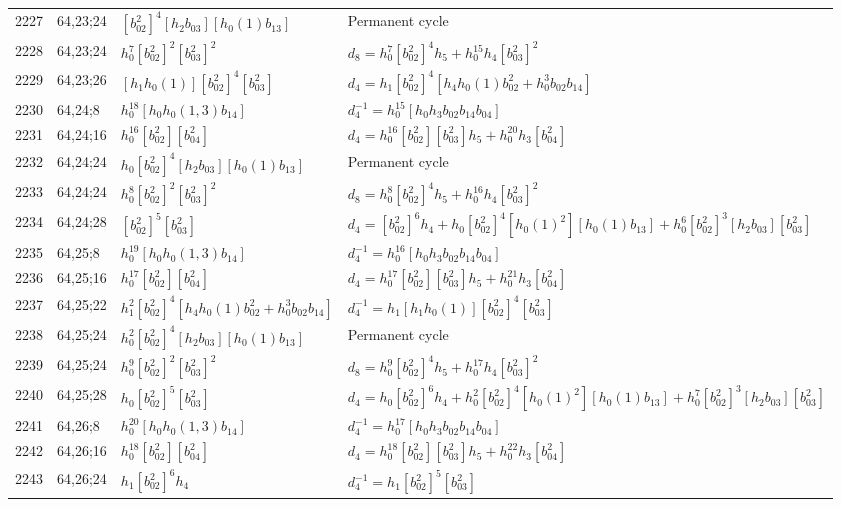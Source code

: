 \documentclass{article}
\begin{document}
\begin{longtable}{|l|l|>{\raggedright\arraybackslash}p{6cm}|>{\raggedright\arraybackslash}p{6cm}|}
\hline
2227 & 64,23;24 & $[b_{02}^2]^4[h_2b_{03}][h_0(1)b_{13}]$ & Permanent cycle\\
2228 & 64,23;24 & $h_0^7[b_{02}^2]^2[b_{03}^2]^2$ &$d_{8}=h_0^7[b_{02}^2]^4h_5 + h_0^{15}h_4[b_{03}^2]^2$\\
\hline
2229 & 64,23;26 & $[h_1h_0(1)][b_{02}^2]^4[b_{03}^2]$ &$d_{4}=h_1[b_{02}^2]^4[h_4h_0(1)b_{02}^2 + h_0^3b_{02}b_{14}]$\\
\hline
2230 & 64,24;8 & $h_0^{18}[h_0h_0(1, 3)b_{14}]$ & $d_{4}^{-1}=h_0^{15}[h_0h_3b_{02}b_{14}b_{04}]$\\
\hline
2231 & 64,24;16 & $h_0^{16}[b_{02}^2][b_{04}^2]$ &$d_{4}=h_0^{16}[b_{02}^2][b_{03}^2]h_5 + h_0^{20}h_3[b_{04}^2]$\\
\hline
2232 & 64,24;24 & $h_0[b_{02}^2]^4[h_2b_{03}][h_0(1)b_{13}]$ & Permanent cycle\\
2233 & 64,24;24 & $h_0^8[b_{02}^2]^2[b_{03}^2]^2$ &$d_{8}=h_0^8[b_{02}^2]^4h_5 + h_0^{16}h_4[b_{03}^2]^2$\\
\hline
2234 & 64,24;28 & $[b_{02}^2]^5[b_{03}^2]$ &$d_{4}=[b_{02}^2]^6h_4 + h_0[b_{02}^2]^4[h_0(1)^2][h_0(1)b_{13}] + h_0^6[b_{02}^2]^3[h_2b_{03}][b_{03}^2]$\\
\hline
2235 & 64,25;8 & $h_0^{19}[h_0h_0(1, 3)b_{14}]$ & $d_{4}^{-1}=h_0^{16}[h_0h_3b_{02}b_{14}b_{04}]$\\
\hline
2236 & 64,25;16 & $h_0^{17}[b_{02}^2][b_{04}^2]$ &$d_{4}=h_0^{17}[b_{02}^2][b_{03}^2]h_5 + h_0^{21}h_3[b_{04}^2]$\\
\hline
2237 & 64,25;22 & $h_1^2[b_{02}^2]^4[h_4h_0(1)b_{02}^2 + h_0^3b_{02}b_{14}]$ & $d_{4}^{-1}=h_1[h_1h_0(1)][b_{02}^2]^4[b_{03}^2]$\\
\hline
2238 & 64,25;24 & $h_0^2[b_{02}^2]^4[h_2b_{03}][h_0(1)b_{13}]$ & Permanent cycle\\
2239 & 64,25;24 & $h_0^9[b_{02}^2]^2[b_{03}^2]^2$ &$d_{8}=h_0^9[b_{02}^2]^4h_5 + h_0^{17}h_4[b_{03}^2]^2$\\
\hline
2240 & 64,25;28 & $h_0[b_{02}^2]^5[b_{03}^2]$ &$d_{4}=h_0[b_{02}^2]^6h_4 + h_0^2[b_{02}^2]^4[h_0(1)^2][h_0(1)b_{13}] + h_0^7[b_{02}^2]^3[h_2b_{03}][b_{03}^2]$\\
\hline
2241 & 64,26;8 & $h_0^{20}[h_0h_0(1, 3)b_{14}]$ & $d_{4}^{-1}=h_0^{17}[h_0h_3b_{02}b_{14}b_{04}]$\\
\hline
2242 & 64,26;16 & $h_0^{18}[b_{02}^2][b_{04}^2]$ &$d_{4}=h_0^{18}[b_{02}^2][b_{03}^2]h_5 + h_0^{22}h_3[b_{04}^2]$\\
\hline
2243 & 64,26;24 & $h_1[b_{02}^2]^6h_4$ & $d_{4}^{-1}=h_1[b_{02}^2]^5[b_{03}^2]$\\

\end{longtable}
\end{document}
